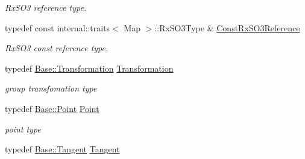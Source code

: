 \begin{DoxyCompactItemize}
\begin{DoxyCompactList}\small\item\em Rx\+S\+O3 reference type. \end{DoxyCompactList}\item 
typedef const internal\+::traits$<$ Map $>$\+::Rx\+S\+O3\+Type \& \hyperlink{class_eigen_1_1_map_3_01_sophus_1_1_sim3_group_3_01___scalar_01_4_00_01___options_01_4_a5b6f2c0d97bc193687b853f2e73c557a}{Const\+Rx\+S\+O3\+Reference}\hypertarget{class_eigen_1_1_map_3_01_sophus_1_1_sim3_group_3_01___scalar_01_4_00_01___options_01_4_a5b6f2c0d97bc193687b853f2e73c557a}{}\label{class_eigen_1_1_map_3_01_sophus_1_1_sim3_group_3_01___scalar_01_4_00_01___options_01_4_a5b6f2c0d97bc193687b853f2e73c557a}

\begin{DoxyCompactList}\small\item\em Rx\+S\+O3 const reference type. \end{DoxyCompactList}\item 
typedef \hyperlink{class_sophus_1_1_sim3_group_base_a93c8c564e3386709dc4cb2fc6d451dd8}{Base\+::\+Transformation} \hyperlink{class_eigen_1_1_map_3_01_sophus_1_1_sim3_group_3_01___scalar_01_4_00_01___options_01_4_ae5c102ed7c31df2b28d05f110decf0c1}{Transformation}\hypertarget{class_eigen_1_1_map_3_01_sophus_1_1_sim3_group_3_01___scalar_01_4_00_01___options_01_4_ae5c102ed7c31df2b28d05f110decf0c1}{}\label{class_eigen_1_1_map_3_01_sophus_1_1_sim3_group_3_01___scalar_01_4_00_01___options_01_4_ae5c102ed7c31df2b28d05f110decf0c1}

\begin{DoxyCompactList}\small\item\em group transfomation type \end{DoxyCompactList}\item 
typedef \hyperlink{class_sophus_1_1_sim3_group_base_a4b50c6b94e402746e50076305781dc9d}{Base\+::\+Point} \hyperlink{class_eigen_1_1_map_3_01_sophus_1_1_sim3_group_3_01___scalar_01_4_00_01___options_01_4_ab2164ab2258180c0a48da013cb8d7c05}{Point}\hypertarget{class_eigen_1_1_map_3_01_sophus_1_1_sim3_group_3_01___scalar_01_4_00_01___options_01_4_ab2164ab2258180c0a48da013cb8d7c05}{}\label{class_eigen_1_1_map_3_01_sophus_1_1_sim3_group_3_01___scalar_01_4_00_01___options_01_4_ab2164ab2258180c0a48da013cb8d7c05}

\begin{DoxyCompactList}\small\item\em point type \end{DoxyCompactList}\item 
typedef \hyperlink{class_sophus_1_1_sim3_group_base_a0f61582b6d8fa46ecbb40d70c87b632c}{Base\+::\+Tangent} \hyperlink{class_eigen_1_1_map_3_01_sophus_1_1_sim3_group_3_01___scalar_01_4_00_01___options_01_4_a26dec0e9d8bc51e5398437d6c02e5d6c}{Tangent}\hypertarget{class_eigen_1_1_map_3_01_sophus_1_1_sim3_group_3_01___scalar_01_4_00_01___options_01_4_a26dec0e9d8bc51e5398437d6c02e5d6c}{}\label{class_eigen_1_1_map_3_01_sophus_1_1_sim3_group_3_01___scalar_01_4_00_01___options_01_4_a26dec0e9d8bc51e5398437d6c02e5d6c}


\end{DoxyCompactItemize}
